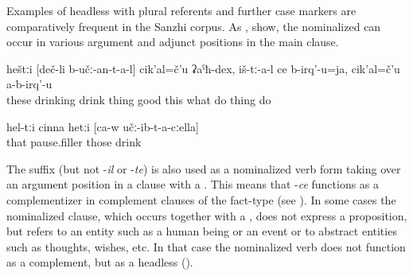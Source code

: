 Examples of headless  with plural referents and further case markers are comparatively frequent in the Sanzhi corpus. As ,  show, the nominalized  can occur in various argument and adjunct positions in the main clause.
%
\begin{exe}
	\ex	\label{ex:‎The ones who are drinking, what good things do they do, they do not do anything (good)}
	\gll	heštːi	[deč-li	b-učː-an-t-a-l]	cik'al=č'u	ʡaˁħ-dex,	iš-tː-a-l	ce	b-irq'-u=ja,		cik'al=č'u	a-b-irq'-u\\
		these	drinking	drink	thing	good	this	what	do	thing	do\\
	\glt	{}

	\ex	\label{ex:these, hm, with whom (he) himself was drinking}
	\gll	hel-tːi	cinna	hetːi	[ca-w	učː-ib-t-a-cːella]\\
		that	pause.filler	those		drink\\
	\glt	{}
\end{exe}

The suffix  (but not -\textit{il} or -\textit{te}) is also used as a nominalized verb form taking over an argument position in a clause with a . This means that -\textit{ce} functions as a complementizer in complement clauses of the fact-type (see ). In some cases the nominalized clause, which occurs together with a , does not express a proposition, but refers to an entity such as a human being or an event or to abstract entities such as thoughts, wishes, etc. In that case the nominalized verb does not function as a complement, but as a headless  ().


